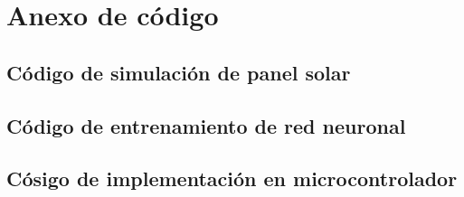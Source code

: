 \chapter{Anexo de código}

\section{Código de simulación de panel solar}

\section{Código de entrenamiento de red neuronal}

\section{Cósigo de implementación en microcontrolador}
